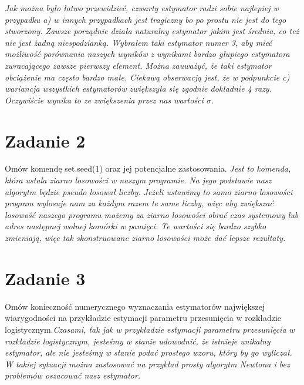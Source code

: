 \documentclass{memoir}
\begin{document}
\textit{Jak można było łatwo przewidzieć, czwarty estymator radzi sobie najlepiej w przypadku a) w innych  przypadkach jest tragiczny bo po prostu nie jest do tego stworzony. Zawsze porządnie działa naturalny estymator jakim jest średnia, co też nie jest żadną niespodzianką. Wybrałem taki estymator numer 3, aby mieć możliwość porównania naszych wyników z wynikami bardzo głupiego estymatora zwracającego zawsze pierwszy element. Można zauważyć, że taki estymator obciążenie ma często bardzo małe. Ciekawą obserwacją jest, że w podpunkcie c) wariancja wszystkich estymatorów zwiększyła się zgodnie dokładnie 4 razy. Oczywiście wynika to ze zwiększenia przez nas wartości $\sigma$.}
\section*{Zadanie 2}
Omów komendę set.seed(1) oraz jej potencjalne zastosowania.
\textit{Jest to komenda, która ustala ziarno losowości w naszym programie. Na jego podstawie nasz algorytm będzie pseudo losował liczby. Jeżeli  ustawimy to samo ziarno losowości program wylosuje nam za każdym razem te same liczby, więc aby zwiększać losowość naszego programu możemy za ziarno losowości obrać czas systemowy lub adres następnej wolnej komórki w pamięci. Te wartości się bardzo szybko zmieniają, więc tak skonstruowane ziarno losowości może dać lepsze rezultaty.}
\section*{Zadanie 3}
Omów konieczność numerycznego wyznaczania estymatorów największej wiarygodności na przykładzie estymacji parametru przesunięcia w rozkładzie logistycznym.\textit{Czasami, tak jak w przykładzie estymacji parametru przesunięcia w rozkładzie logistycznym, jesteśmy w stanie udowodnić, że istnieje unikalny estymator, ale nie jesteśmy w stanie podać prostego wzoru, który by go wyliczał. W takiej sytuacji można zastosować na przykład prosty algorytm Newtona i bez problemów oszacować nasz estymator. }
\end{document}
